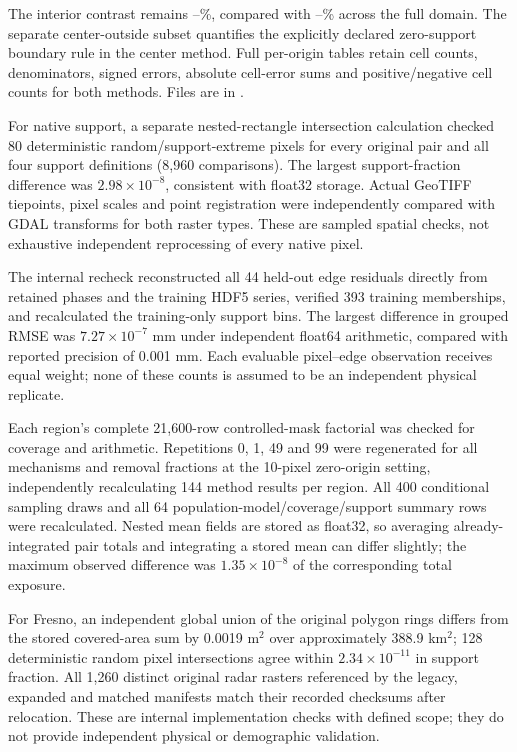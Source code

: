 \documentclass[10pt,a4paper]{article}
\begin{document}
The interior contrast remains \InteriorBiasMin{}--\InteriorBiasMax{}\%, compared with \UniformBiasMin{}--\UniformBiasMax{}\% across the full domain. The separate center-outside subset quantifies the explicitly declared zero-support boundary rule in the center method. Full per-origin tables retain cell counts, denominators, signed errors, absolute cell-error sums and positive/negative cell counts for both methods. Files are in .

For native support, a separate nested-rectangle intersection calculation checked 80 deterministic random/support-extreme pixels for every original pair and all four support definitions (8,960 comparisons). The largest support-fraction difference was $2.98\times10^{-8}$, consistent with float32 storage. Actual GeoTIFF tiepoints, pixel scales and point registration were independently compared with GDAL transforms for both raster types. These are sampled spatial checks, not exhaustive independent reprocessing of every native pixel.

The internal recheck reconstructed all 44 held-out edge residuals directly from retained phases and the training HDF5 series, verified 393 training memberships, and recalculated the training-only support bins. The largest difference in grouped RMSE was $7.27\times10^{-7}$ mm under independent float64 arithmetic, compared with reported precision of 0.001 mm. Each evaluable pixel--edge observation receives equal weight; none of these counts is assumed to be an independent physical replicate.

Each region's complete 21,600-row controlled-mask factorial was checked for coverage and arithmetic. Repetitions 0, 1, 49 and 99 were regenerated for all mechanisms and removal fractions at the 10-pixel zero-origin setting, independently recalculating 144 method results per region. All 400 conditional sampling draws and all 64 population-model/coverage/support summary rows were recalculated. Nested mean fields are stored as float32, so averaging already-integrated pair totals and integrating a stored mean can differ slightly; the maximum observed difference was $1.35\times10^{-8}$ of the corresponding total exposure.

For Fresno, an independent global union of the original polygon rings differs from the stored covered-area sum by 0.0019 m$^2$ over approximately 388.9 km$^2$; 128 deterministic random pixel intersections agree within $2.34\times10^{-11}$ in support fraction. All 1,260 distinct original radar rasters referenced by the legacy, expanded and matched manifests match their recorded checksums after relocation. These are internal implementation checks with defined scope; they do not provide independent physical or demographic validation.
\end{document}
